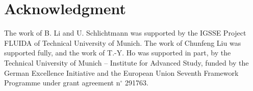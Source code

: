 \section*{Acknowledgment}

The work of B. Li and U. Schlichtmann was supported by the IGSSE Project FLUIDA of
Technical University of Munich. 
The work of Chunfeng Liu was supported fully, and the work of 
T.-Y. Ho was supported in part, by the Technical University
of Munich -- Institute for Advanced Study, funded by the German
Excellence Initiative and the European Union Seventh Framework Programme under
grant agreement n$^\circ$ 291763.

